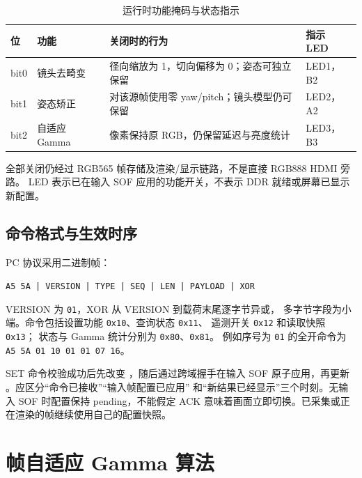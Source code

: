 \begin{table}[htbp]\centering\small
\caption{运行时功能掩码与状态指示}\label{tab:mask}
\begin{tabularx}{\textwidth}{p{1.4cm}p{2.3cm}Yp{2.2cm}}
\toprule
位 & 功能 & 关闭时的行为 & 指示 LED \\
\midrule
bit0 & 镜头去畸变 & 径向缩放为 1，切向偏移为 0；姿态可独立保留 & LED1，B2 \\
bit1 & 姿态矫正 & 对该源帧使用零 yaw/pitch；镜头模型仍可保留 & LED2，A2 \\
bit2 & 自适应 Gamma & 像素保持原 RGB，仍保留延迟与亮度统计 & LED3，B3 \\
\bottomrule
\end{tabularx}
\end{table}
全部关闭仍经过 RGB565 帧存储及渲染/显示链路，不是直接 RGB888 HDMI 旁路。
LED 表示已在输入 SOF 应用的功能开关，不表示 DDR 就绪或屏幕已显示新配置。

\subsection{命令格式与生效时序}
PC 协议采用二进制帧：
\begin{center}
\texttt{A5 5A | VERSION | TYPE | SEQ | LEN | PAYLOAD | XOR}
\end{center}
VERSION 为 \texttt{01}，XOR 从 VERSION 到载荷末尾逐字节异或，
多字节字段为小端。命令包括设置功能 \texttt{0x10}、查询状态 \texttt{0x11}、
遥测开关 \texttt{0x12} 和读取快照 \texttt{0x13}；
状态与 Gamma 统计分别为 \texttt{0x80}、\texttt{0x81}。
例如序号为 \texttt{01} 的全开命令为
\texttt{A5 5A 01 10 01 01 07 16}。

SET 命令校验成功后先改变 ，随后通过跨域握手在输入 SOF
原子应用，再更新 。应区分“命令已接收”“输入帧配置已应用”
和“新结果已经显示”三个时刻。无输入 SOF 时配置保持 pending，不能假定 ACK
意味着画面立即切换。已采集或正在渲染的帧继续使用自己的配置快照。


\section{帧自适应 Gamma 算法}
